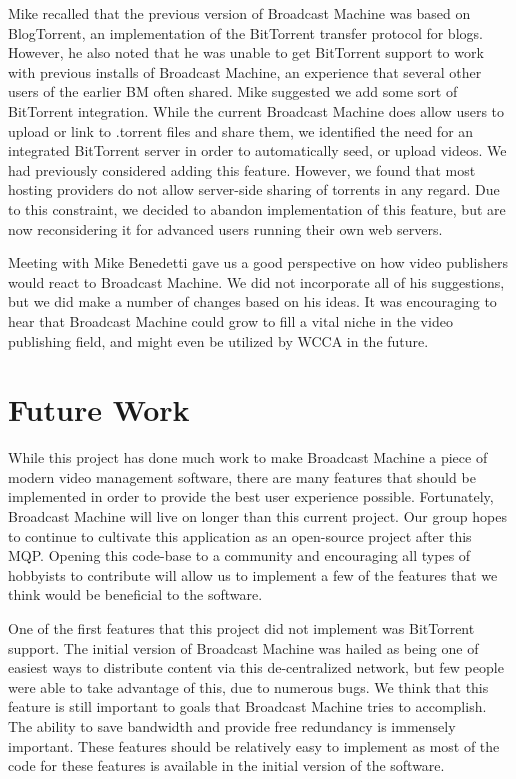 \documentclass[a4paper,12pt]{report}
\begin{document}
Mike recalled that the previous version of Broadcast Machine was based on BlogTorrent, an implementation of the BitTorrent transfer protocol for blogs. 
However, he also noted that he was unable to get BitTorrent support to work with previous installs of Broadcast Machine, an experience that several other users of the earlier BM often shared. 
Mike suggested we add some sort of BitTorrent integration.
While the current Broadcast Machine does allow users to upload or link to .torrent files and share them, we identified the need for an integrated BitTorrent server in order to automatically seed, or upload videos. We had previously considered adding this feature. However, we found that most hosting providers do not allow server-side sharing of torrents in any regard. Due to this constraint, we decided to abandon implementation of this feature, but are now reconsidering it for advanced users running their own web servers.

Meeting with Mike Benedetti gave us a good perspective on how video publishers would react to Broadcast Machine. 
We did not incorporate all of his suggestions, but we did make a number of changes based on his ideas. 
It was encouraging to hear that Broadcast Machine could grow to fill a vital niche in the video publishing field, and might even be utilized by WCCA in the future.

\chapter{Future Work}
While this project has done much work to make Broadcast Machine a piece of modern video management software, there are many features that should be implemented in order to provide the best user experience possible.
Fortunately, Broadcast Machine will live on longer than this current project.
Our group hopes to continue to cultivate this application as an open-source project after this MQP.
Opening this code-base to a community and encouraging all types of hobbyists to contribute will allow us to implement a few of the features that we think would be beneficial to the software.

One of the first features that this project did not implement was BitTorrent support.
The initial version of Broadcast Machine was hailed as being one of easiest ways to distribute content via this de-centralized network, but few people were able to take advantage of this, due to numerous bugs.
We think that this feature is still important to goals that Broadcast Machine tries to accomplish.
The ability to save bandwidth and provide free redundancy is immensely important.
These features should be relatively easy to implement as most of the code for these features is available in the initial version of the software.
\end{document}
